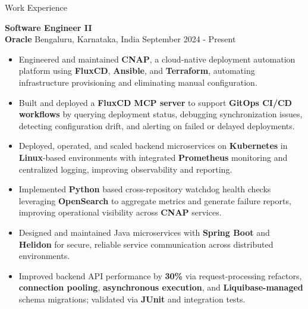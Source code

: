 \documentclass{resume}
\begin{document}
\begin{rSection}{Work Experience}

\textbf{Software Engineer II} \\
\textbf{Oracle} \textbar{} Bengaluru, Karnataka, India \hspace*{\fill} September 2024 - Present
\vspace{-2pt}
\begin{itemize}
    \item Engineered and maintained \textbf{CNAP}, a cloud-native deployment automation platform using \textbf{FluxCD}, \textbf{Ansible}, and \textbf{Terraform}, automating infrastructure provisioning and eliminating manual configuration.
    \item Built and deployed a \textbf{FluxCD MCP server} to support \textbf{GitOps CI/CD workflows} by querying deployment status, debugging synchronization issues, detecting configuration drift, and alerting on failed or delayed deployments.
    \item Deployed, operated, and scaled backend microservices on \textbf{Kubernetes} in \textbf{Linux}-based environments with integrated \textbf{Prometheus} monitoring and centralized logging, improving observability and reporting.
    \item Implemented \textbf{Python} based cross-repository watchdog health checks leveraging \textbf{OpenSearch} to aggregate metrics and generate failure reports, improving operational visibility across \textbf{CNAP} services.
    \item Designed and maintained Java microservices with \textbf{Spring Boot} and \textbf{Helidon} for secure, reliable service communication across distributed environments.
    \item Improved backend API performance by \textbf{30\%} via request-processing refactors, \textbf{connection pooling}, \textbf{asynchronous execution}, and \textbf{Liquibase-managed} schema migrations; validated via \textbf{JUnit} and integration tests.
\end{itemize}


\end{rSection}
\end{document}
